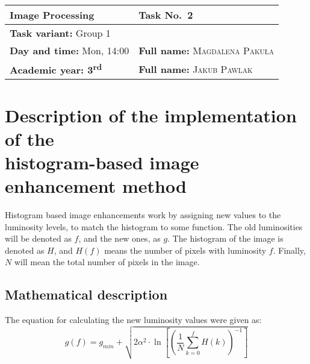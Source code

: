 \documentclass[12pt]{article}
\theoremstyle{definition}
\begin{document}
\pagestyle{fancy}
\fancyhead{}
\fancyfoot[C]{\thepage}

\thispagestyle{empty}
\renewcommand{\arraystretch}{2}
\begin{flushleft}
    \begin{tabularx}{0.95\textwidth}{|X|X|}
        \hline
        \bf \large Image Processing                   & \bf \large Task No.~2                           \\ \hline
        \multicolumn{2}{|l|}{
            \textbf{Task variant:} Group 1
        }                                                                                               \\ \hline
        \textbf{Day and time:} Mon, 14:00             & \textbf{Full name:} \textsc{Magdalena Paku\l a} \\
        \textbf{Academic year: 3\textsuperscript{rd}} & \textbf{Full name:} \textsc{Jakub Pawlak}       \\
        \hline
    \end{tabularx}
\end{flushleft}
\vspace{1em}
\renewcommand{\arraystretch}{1}

\section{Description of the implementation of the \\ histogram-based image enhancement method}
Histogram based image enhancements work by assigning new values to the luminosity levels, to match the histogram to some function.
The old luminosities will be denoted as $f$, and the new ones, as $g$.
The histogram of the image is denoted as $H$, and $H(f)$ means the number of pixels with luminosity $f$.
Finally, $N$ will mean the total number of pixels in the image.

\subsection{Mathematical description}

The equation for calculating the new luminosity values were given as:
\begin{equation}
    g(f) = g_{min} +\sqrt{
        2 \alpha^2 \cdot \ln\left[
        \left(
            \frac{1}{N} \sum\limits_{k=0}^f H(k)
        \right)^{-1}
        \right]
    }
    \label{eq:rayleigh-initial}
\end{equation}
\end{document}
